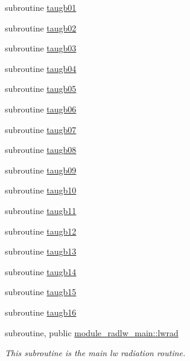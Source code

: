 \begin{DoxyCompactItemize}
subroutine \hyperlink{zhang__orig_2radlw__main_8f_a001d1bcd17533f7f920f859ff9a4e60f}{taugb01}
\item 
subroutine \hyperlink{zhang__orig_2radlw__main_8f_a926415cb51870dda9a90883e01a2ee38}{taugb02}
\item 
subroutine \hyperlink{zhang__orig_2radlw__main_8f_a45e39b507d1fc031c80d9c7f06905d4a}{taugb03}
\item 
subroutine \hyperlink{zhang__orig_2radlw__main_8f_ae69174bcf1a87dc7a5baffac69797d07}{taugb04}
\item 
subroutine \hyperlink{zhang__orig_2radlw__main_8f_a92653ffcd20ff247a00eaf3339cba6df}{taugb05}
\item 
subroutine \hyperlink{zhang__orig_2radlw__main_8f_a7190d415614aa35deefacff1041d4719}{taugb06}
\item 
subroutine \hyperlink{zhang__orig_2radlw__main_8f_a2208d86ae0712a0ca426bbe96de825bc}{taugb07}
\item 
subroutine \hyperlink{zhang__orig_2radlw__main_8f_a1447d5bda5b521d27171e61881684183}{taugb08}
\item 
subroutine \hyperlink{zhang__orig_2radlw__main_8f_a889abbaaa2d421c0c3dc820e2004414d}{taugb09}
\item 
subroutine \hyperlink{zhang__orig_2radlw__main_8f_a74c1cb8390daff1e5ce5e863c50b7873}{taugb10}
\item 
subroutine \hyperlink{zhang__orig_2radlw__main_8f_a573fd5b3580d6bbf5bfa2f01ee547034}{taugb11}
\item 
subroutine \hyperlink{zhang__orig_2radlw__main_8f_ae56eaa9e3b897ca235d4d6b271cc1e47}{taugb12}
\item 
subroutine \hyperlink{zhang__orig_2radlw__main_8f_a2ac7254d2dcff516e8e44b8b679302c0}{taugb13}
\item 
subroutine \hyperlink{zhang__orig_2radlw__main_8f_a26140cbe1a3d6119b56cf5c2d539670e}{taugb14}
\item 
subroutine \hyperlink{zhang__orig_2radlw__main_8f_a93b5c0ae0525697ffffb6228581a301c}{taugb15}
\item 
subroutine \hyperlink{zhang__orig_2radlw__main_8f_a942ce0031745cd1b3b4ebc3915970554}{taugb16}
\end{DoxyCompactItemize}
{\bf }\par
\begin{DoxyCompactItemize}
\item 
subroutine, public \hyperlink{group__module__radlw__main_gafa8b4b82b3e9a4d707ad02ee53f981cb}{module\+\_\+radlw\+\_\+main\+::lwrad}
\begin{DoxyCompactList}\small\item\em This subroutine is the main lw radiation routine. \end{DoxyCompactList}\end{DoxyCompactItemize}

